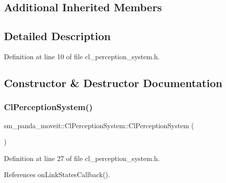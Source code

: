 \subsection*{Additional Inherited Members}


\subsection{Detailed Description}


Definition at line 10 of file cl\+\_\+perception\+\_\+system.\+h.



\subsection{Constructor \& Destructor Documentation}
\mbox{\label{classsm__panda__moveit_1_1ClPerceptionSystem_acbab40cf31fbcd8733a9a40821cb7b13}} 
\subsubsection{\texorpdfstring{Cl\+Perception\+System()}{ClPerceptionSystem()}}
{\footnotesize\ttfamily sm\+\_\+panda\+\_\+moveit\+::\+Cl\+Perception\+System\+::\+Cl\+Perception\+System (\begin{DoxyParamCaption}{ }\end{DoxyParamCaption})\hspace{0.3cm}{\ttfamily [inline]}}



Definition at line 27 of file cl\+\_\+perception\+\_\+system.\+h.



References on\+Link\+States\+Callback().


